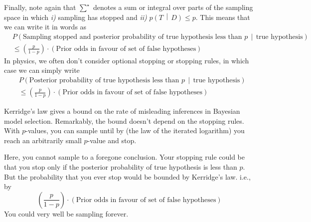 \documentclass[12pt]{article}
\newcommand{\given}{\, \middle| \,}
\newcommand{\Prob}[2]{P\left(#1 \given #2 \right)}
\newcommand{\prob}[2]{p\left(#1 \given #2 \right)}
\begin{document}
Finally, note again that $\sum^\star$ denotes a sum or integral over parts of the sampling space in which \emph{i)} sampling has stopped and \emph{ii)} $\prob{T}{D} \le p$. This means that we can write it in words as
\begin{equation}
\begin{split}
&\Prob{\text{Sampling stopped and posterior probability of true hypothesis less than $p$}}{\text{true hypothesis}} \\
&\le \left(\frac{p}{1 - p}\right) \cdot (\text{Prior odds in favour of set of false hypotheses})
\end{split}
\end{equation}
In physics, we often don't consider optional stopping or stopping rules, in which case we can simply write
\begin{equation}
\begin{split}
&\Prob{\text{Posterior probability of true hypothesis less than $p$}}{\text{true hypothesis}} \\
&\le \left(\frac{p}{1 - p}\right) \cdot (\text{Prior odds in favour of set of false hypotheses})
\end{split}
\end{equation}

Kerridge's law gives a bound on the rate of misleading inferences in Bayesian model selection. Remarkably, the bound doesn't depend on the stopping rules. With $p$-values, you can sample until by (the law of the iterated logarithm) you reach an arbitrarily small $p$-value and stop. 

Here, you cannot sample to a foregone conclusion. Your stopping rule could be that you stop only if the posterior probability of true hypothesis is less than $p$. But the probability that you ever stop would be bounded by Kerridge's law. i.e., by 
\begin{equation}
\left(\frac{p}{1 - p}\right) \cdot (\text{Prior odds in favour of set of false hypotheses})
\end{equation}
You could very well be sampling forever.



\end{document}
